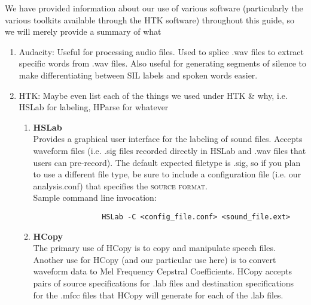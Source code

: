 \documentclass{wileySev}
\begin{document}
We have provided information about our use of various software (particularly the various toolkits available through the HTK software) throughout this guide, so we will merely provide a summary of what 
\begin{enumerate}
	\item Audacity: Useful for processing audio files. Used to splice .wav files to extract specific words from .wav files. Also useful for generating segments of silence to make differentiating between SIL labels and spoken words easier.
	\item HTK: Maybe even list each of the things we used under HTK \& why, i.e. HSLab for labeling, HParse for whatever
		\begin{enumerate}
			\item \textbf{HSLab}\\
				Provides a graphical user interface for the labeling of sound files. Accepts waveform files (i.e. .sig files recorded directly in HSLab and .wav files that users can pre-record). The default expected filetype is .sig, so if you plan to use a different file type, be sure to include a configuration file (i.e. our analysis.conf) that specifies the \textsc{source format}.\\
				
				Sample command line invocation: 
				\begin{verbatim}
				HSLab -C <config_file.conf> <sound_file.ext>
				\end{verbatim}
			\item \textbf{HCopy}\\
				The primary use of HCopy is to copy and manipulate speech files. Another use for HCopy (and our particular use here) is to convert waveform data to Mel Frequency Cepstral Coefficients.
				HCopy accepts pairs of source specifications for .lab files and destination specifications for the .mfcc files that HCopy will generate for each of the .lab files.
				

\end{enumerate}
\end{enumerate}
\end{document}
